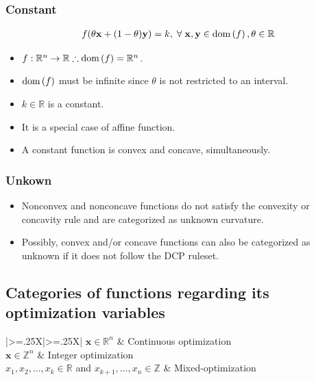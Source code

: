 \documentclass{article}
\newcommand{\dom}[1]{\ensuremath{\textnormal{dom}\left(#1\right)}} %
\begin{document}
\subsubsection{Constant}
\begin{align}
	f(\theta \mathbf{x} + (1-\theta)\mathbf{y}) = k,\;\forall\; \mathbf{x}, \mathbf{y} \in \dom{f}, \theta \in \mathbb{R}
\end{align}
\begin{itemize}
	\item \(f: \mathbb{R}^{n} \rightarrow \mathbb{R} \therefore \dom{f} = \mathbb{R}^{n}\).
	\item \(\dom{f}\) must be infinite since \(\theta\) is not restricted to an interval.
	\item \(k\in \mathbb{R}\) is a constant.
	\item It is a special case of affine function.
	\item A constant function is convex and concave, simultaneously.
\end{itemize}
\subsubsection{Unkown}
\begin{itemize}
	\item Nonconvex and nonconcave functions do not satisfy the convexity or concavity rule and are categorized as unknown curvature.
	\item Possibly, convex and/or concave functions can also be categorized as unknown if it does not follow the DCP ruleset.
\end{itemize}
\subsection{Categories of functions regarding its optimization variables}
\begin{xltabular}[l]{\linewidth}{|>{\hsize=.25\hsize}X|>{\hsize=.25\hsize}X|}
	\hline
	\(\mathbf{x}\in \mathbb{R}^{n}\)     & Continuous optimization     \\ \hline
	\(\mathbf{x}\in \mathbb{Z}^{n}\)     & Integer optimization        \\ \hline
	\(x_1,x_2,\dots,x_k \in \mathbb{R}\) and \(x_{k+1}, \dots, x_n \in \mathbb{Z}\)         & Mixed-optimization        \\ \hline
\end{xltabular}
\end{document}
